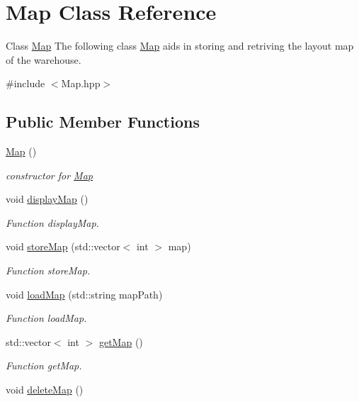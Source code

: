 \hypertarget{classMap}{}\section{Map Class Reference}
\label{classMap}


Class \hyperlink{classMap}{Map} The following class \hyperlink{classMap}{Map} aids in storing and retriving the layout map of the warehouse.  




{\ttfamily \#include $<$Map.\+hpp$>$}

\subsection*{Public Member Functions}
\begin{DoxyCompactItemize}
\item 
\hyperlink{classMap_a0f5ad0fd4563497b4214038cbca8b582}{Map} ()
\begin{DoxyCompactList}\small\item\em constructor for \hyperlink{classMap}{Map} \end{DoxyCompactList}\item 
void \hyperlink{classMap_ac5af28a5fed55d9ca5d1dab5cb9f3f9c}{display\+Map} ()
\begin{DoxyCompactList}\small\item\em Function display\+Map. \end{DoxyCompactList}\item 
void \hyperlink{classMap_aca6589cba2756d406cb360502d29fab3}{store\+Map} (std\+::vector$<$ int $>$ map)
\begin{DoxyCompactList}\small\item\em Function store\+Map. \end{DoxyCompactList}\item 
void \hyperlink{classMap_a9359d68382e0c472217d4aeddceeeed8}{load\+Map} (std\+::string map\+Path)
\begin{DoxyCompactList}\small\item\em Function load\+Map. \end{DoxyCompactList}\item 
std\+::vector$<$ int $>$ \hyperlink{classMap_a0b3456dfc306a8bfbf890e4e3abcb7e0}{get\+Map} ()
\begin{DoxyCompactList}\small\item\em Function get\+Map. \end{DoxyCompactList}\item 
void \hyperlink{classMap_a0586f5778e3b03ff28be2a5b87249752}{delete\+Map} ()

\end{DoxyCompactItemize}
